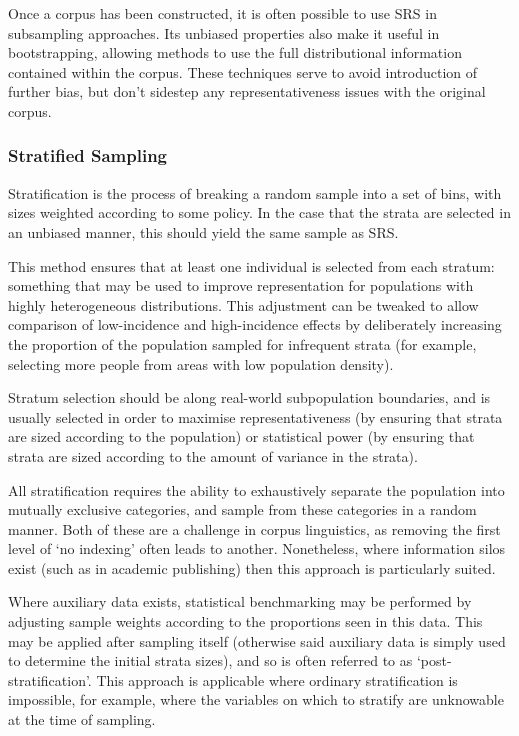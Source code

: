 Once a corpus has been constructed, it is often possible to use SRS in subsampling approaches.  Its unbiased properties also make it useful in bootstrapping, allowing methods to use the full distributional information contained within the corpus\cite{gries2006exploring}.  These techniques serve to avoid introduction of further bias, but don't sidestep any representativeness issues with the original corpus.


\subsubsection{Stratified Sampling}
Stratification is the process of breaking a random sample into a set of bins, with sizes weighted according to some policy.  In the case that the strata are selected in an unbiased manner, this should yield the same sample as SRS.

This method ensures that at least one individual is selected from each stratum: something that may be used to improve representation for populations with highly heterogeneous distributions.  This adjustment can be tweaked to allow comparison of low-incidence and high-incidence effects by deliberately increasing the proportion of the population sampled for infrequent strata (for example, selecting more people from areas with low population density).

Stratum selection should be along real-world subpopulation boundaries, and is usually selected in order to maximise representativeness (by ensuring that strata are sized according to the population) or statistical power (by ensuring that strata are sized according to the amount of variance in the strata).

All stratification requires the ability to exhaustively separate the population into mutually exclusive categories, and sample from these categories in a random manner.  Both of these are a challenge in corpus linguistics, as removing the first level of `no indexing' often leads to another.  Nonetheless, where information silos exist (such as in academic publishing) then this approach is particularly suited.

Where auxiliary data exists, statistical benchmarking may be performed by adjusting sample weights according to the proportions seen in this data.  This may be applied after sampling itself (otherwise said auxiliary data is simply used to determine the initial strata sizes), and so is often referred to as `post-stratification'.  This approach is applicable where ordinary stratification is impossible, for example, where the variables on which to stratify are unknowable at the time of sampling.


